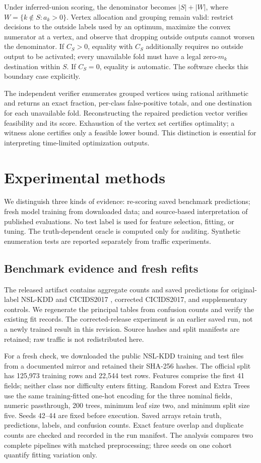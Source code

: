 \documentclass[twocolumn]{svjour3}
\begin{document}
Under inferred-union scoring, the denominator becomes $|S|+|W|$, where $W=\{k \notin S:a_k>0\}$. Vertex allocation and grouping remain valid: restrict decisions to the outside labels used by an optimum, maximize the convex numerator at a vertex, and observe that dropping outside outputs cannot worsen the denominator. If $C_S>0$, equality with $C_S$ additionally requires no outside output to be activated; every unavailable fold must have a legal zero-$m_k$ destination within $S$. If $C_S=0$, equality is automatic. The software checks this boundary case explicitly.

The independent verifier enumerates grouped vertices using rational arithmetic and returns an exact fraction, per-class false-positive totals, and one destination for each unavailable fold. Reconstructing the repaired prediction vector verifies feasibility and its score. Exhaustion of the vertex set certifies optimality; a witness alone certifies only a feasible lower bound. This distinction is essential for interpreting time-limited optimization outputs.

\section{Experimental methods}
We distinguish three kinds of evidence: re-scoring saved benchmark predictions; fresh model training from downloaded data; and source-based interpretation of published evaluations. No test label is used for feature selection, fitting, or tuning. The truth-dependent oracle is computed only for auditing. Synthetic enumeration tests are reported separately from traffic experiments.

\subsection{Benchmark evidence and fresh refits}
The released artifact contains aggregate counts and saved predictions for original-label NSL-KDD \cite{tavallaee2009} and CICIDS2017 \cite{sharafaldin2018}, corrected CICIDS2017, and supplementary controls. We regenerate the principal tables from confusion counts and verify the existing fit records. The corrected-release experiment is an earlier saved run, not a newly trained result in this revision. Source hashes and split manifests are retained; raw traffic is not redistributed here.

For a fresh check, we downloaded the public NSL-KDD training and test files from a documented mirror and retained their SHA-256 hashes. The official split has 125,973 training rows and 22,544 test rows. Features comprise the first 41 fields; neither class nor difficulty enters fitting. Random Forest and Extra Trees use the same training-fitted one-hot encoding for the three nominal fields, numeric passthrough, 200 trees, minimum leaf size two, and minimum split size five. Seeds 42--44 are fixed before execution. Saved arrays retain truth, predictions, labels, and confusion counts. Exact feature overlap and duplicate counts are checked and recorded in the run manifest. The analysis compares two complete pipelines with matched preprocessing; three seeds on one cohort quantify fitting variation only.
\end{document}
